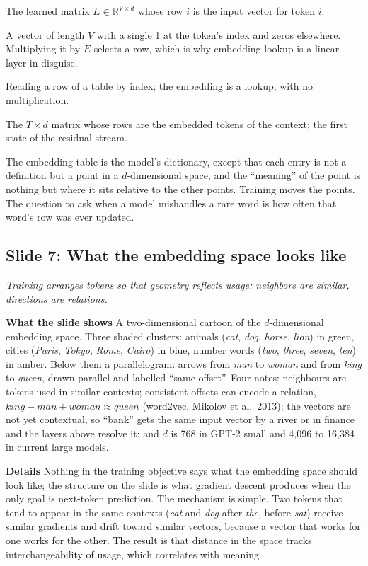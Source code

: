 \documentclass[11pt,letterpaper]{article}
\newcommand{\slide}[3]{%
  \subsection[Slide #1: #2]{Slide #1: #2}%
  {\color{muted}\itshape #3\par}\medskip}
\newcommand{\para}[1]{\medskip\noindent\textbf{#1}\quad}
\newenvironment{terms}{\begin{tcolorbox}[termsbox]\begin{description}[leftmargin=1.1em,itemsep=3pt,topsep=2pt,font=\normalfont]}{\end{description}\end{tcolorbox}}
\newcommand{\term}[2]{\item[\textbf{#1}]\index{#1} #2}
\newenvironment{intuition}{\begin{tcolorbox}[intuitionbox]}{\end{tcolorbox}}
\begin{document}
\begin{terms}
\term{embedding table}{The learned matrix $E\in\mathbb{R}^{V\times d}$ whose row $i$ is the input vector for token $i$.}
\term{one-hot vector}{A vector of length $V$ with a single 1 at the token's index and zeros elsewhere. Multiplying it by $E$ selects a row, which is why embedding lookup is a linear layer in disguise.}
\term{lookup}{Reading a row of a table by index; the embedding is a lookup, with no multiplication.}
\term{input matrix $X$}{The $T\times d$ matrix whose rows are the embedded tokens of the context; the first state of the residual stream.}
\end{terms}

\begin{intuition}
The embedding table is the model's dictionary, except that each entry is not a definition but a point in a $d$-dimensional space, and the ``meaning'' of the point is nothing but where it sits relative to the other points. Training moves the points. The question to ask when a model mishandles a rare word is how often that word's row was ever updated.
\end{intuition}

\slide{7}{What the embedding space looks like}{Training arranges tokens so that geometry reflects usage: neighbors are similar, directions are relations.}

\para{What the slide shows} A two-dimensional cartoon of the $d$-dimensional embedding space. Three shaded clusters: animals (\emph{cat}, \emph{dog}, \emph{horse}, \emph{lion}) in green, cities (\emph{Paris}, \emph{Tokyo}, \emph{Rome}, \emph{Cairo}) in blue, number words (\emph{two}, \emph{three}, \emph{seven}, \emph{ten}) in amber. Below them a parallelogram: arrows from \emph{man} to \emph{woman} and from \emph{king} to \emph{queen}, drawn parallel and labelled ``same offset''. Four notes: neighbours are tokens used in similar contexts; consistent offsets can encode a relation, $\textit{king}-\textit{man}+\textit{woman}\approx\textit{queen}$ (word2vec, Mikolov et al.\ 2013); the vectors are not yet contextual, so ``bank'' gets the same input vector by a river or in finance and the layers above resolve it; and $d$ is 768 in GPT-2 small and 4,096 to 16,384 in current large models.

\para{Details} Nothing in the training objective says what the embedding space should look like; the structure on the slide is what gradient descent produces when the only goal is next-token prediction. The mechanism is simple. Two tokens that tend to appear in the same contexts (\emph{cat} and \emph{dog} after \emph{the}, before \emph{sat}) receive similar gradients and drift toward similar vectors, because a vector that works for one works for the other. The result is that distance in the space tracks interchangeability of usage, which correlates with meaning.
\end{document}
